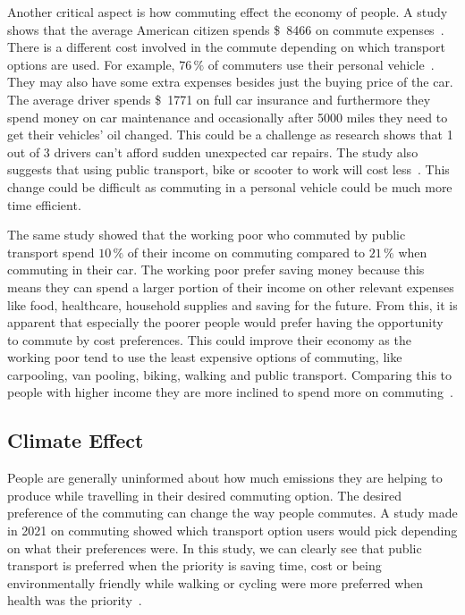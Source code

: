 Another critical aspect is how commuting effect the economy of people.
A study shows that the average American citizen spends \SI{8466}[\$]{} on commute expenses~\cite{bankrate2023}.
There is a different cost involved in the commute depending on which transport options are used.
For example, \(76\,\%\) of commuters use their personal vehicle~\cite{bankrate2023}.
They may also have some extra expenses besides just the buying price of the car.
The average driver spends \SI{1771}[\$]{} on full car insurance and furthermore they spend money on car maintenance
and occasionally after 5000 miles they need to get their vehicles' oil changed.
This could be a challenge as research shows that 1 out of 3 drivers can't afford sudden unexpected car repairs.
The study also suggests that using public transport, bike or scooter to work will cost less~\cite{bankrate2023}.
This change could be difficult as commuting in a personal vehicle could be much more time efficient.

The same study showed that the working poor who commuted by public transport spend \(10\,\%\) of their income on
commuting compared to \(21\,\%\) when commuting in their car.
The working poor prefer saving money because this means they can spend a larger portion of their income on other
relevant expenses like food, healthcare, household supplies and saving for the future.
From this, it is apparent that especially the poorer people would prefer having the opportunity to
commute by cost preferences.
This could improve their economy as the working poor tend to use the least expensive options of commuting, like
carpooling, van pooling, biking, walking and public transport.
Comparing this to people with higher income they are more inclined to spend more on commuting~\cite{bankrate2023}.

\subsection{Climate Effect}\label{subsec:climate-effect}

People are generally uninformed about how much emissions they are helping to produce while travelling in their
desired commuting option.
The desired preference of the commuting can change the way people commutes.
A study made in 2021 on commuting showed which transport option users would pick depending on what their preferences
were.
In this study, we can clearly see that public transport is preferred when the priority is saving time, cost or being
environmentally friendly while walking or cycling were more preferred when health was the priority~\cite{spark2023}.


